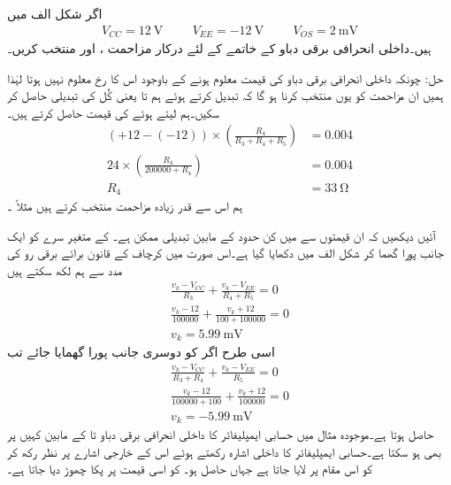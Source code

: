 اگر شکل  الف میں
\begin{align*}
V_{CC} =\SI{12}{\volt} \hspace{1cm} V_{EE}=\SI{-12}{\volt} \hspace{1cm} V_{OS}=\SI{2}{\milli \volt}
\end{align*}
ہیں۔داخلی انحرافی برقی دباو کے خاتمے کے لئے درکار مزاحمت ،  اور  منتخب کریں۔

حل:	چونکہ داخلی انحرافی برقی دباو کی قیمت معلوم ہونے کے باوجود اس کا رخ معلوم نہیں ہوتا لہٰذا ہمیں ان مزاحمت کو یوں منتخب کرنا ہو گا کہ  تبدیل کرتے ہوئے ہم  تا  یعنی کُل  کی تبدیلی حاصل کر سکیں۔ہم لیتے ہوئے  کی قیمت حاصل کرتے ہیں۔
\begin{align*}
 \left(+12-(-12) \right ) \times \left (\frac{R_4}{R_3+R_4+R_5} \right )&=0.004\\
 24 \times \left ( \frac{R_4}{200000+R_4} \right )&=0.004\\
 R_4 &= \SI{33}{\ohm}
\end{align*}
ہم اس سے قدر زیادہ مزاحمت منتخب کرتے ہیں مثلاً ۔

آئیں دیکھیں کہ ان قیمتوں سے  میں کن حدود کے مابین تبدیلی ممکن ہے۔ کے متغیر سرے کو ایک جانب پورا گھما کر شکل  الف     میں دکھایا گیا ہے۔اس صورت میں کرچاف کے قانون برائے برقی رو کی مدد سے ہم لکھ سکتے ہیں
\begin{align*}
\frac{v_k-V_{CC}}{R_3}+\frac{v_k-V_{EE}}{R_4+R_5}=0\\
\frac{v_k-12}{100000}+\frac{v_k+12}{100+100000}=0\\
v_k=\SI{5.99}{\milli \volt}
\end{align*}
اسی طرح اگر  کو دوسری جانب پورا گھمایا جائے تب
\begin{align*}
\frac{v_k-V_{CC}}{R_3+R_4}+\frac{v_k-V_{EE}}{R_5}=0\\
\frac{v_k-12}{100000+100}+\frac{v_k+12}{100000}=0\\
v_k=-\SI{5.99}{\milli \volt}
\end{align*}
حاصل ہوتا ہے۔موجودہ مثال میں حسابی ایمپلیفائر کا داخلی انحرافی برقی دباو  تا کے مابین کہیں پر بھی ہو سکتا ہے۔حسابی ایمپلیفائر کا داخلی اشارہ  رکھتے ہوئے اس  کے خارجی اشارے   پر نظر رکھ کر  کو اس مقام پر لایا جاتا ہے جہاں  حاصل ہو۔ کو اسی قیمت پر پکا چھوڑ دیا جاتا ہے۔

